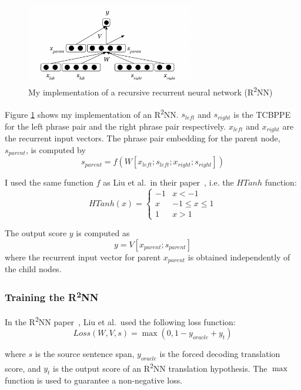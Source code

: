 \documentclass[12pt,a4paper,twoside]{report}
\begin{document}
\begin{figure}[ht]
\centering
\includegraphics[width=0.65\textwidth]{images/r2nn_imple.png}
\caption{My implementation of a recursive recurrent neural network (R\textsuperscript{2}NN)}
\label{fig:r2nn_imple}
\end{figure}

Figure \ref{fig:r2nn_imple} shows my implementation of an R\textsuperscript{2}NN. $s_{left}$ and $s_{right}$ is the TCBPPE for the left phrase pair and the right phrase pair respectively. $x_{left}$ and $x_{right}$ are the recurrent input vectors. The phrase pair embedding for the parent node, $s_{parent}$, is computed by
\[ s_{parent} = f(W[x_{left};s_{left};x_{right};s_{right}]) \]

I used the same function $f$ as Liu et al.~in their paper~\cite{r2nn}, i.e. the $HTanh$ function:
\[ HTanh(x) =
    \begin{cases}
      -1 & x < -1 \\
      x & -1\leq x\leq 1 \\
      1 & x > 1
   \end{cases}
\]

The output score $y$ is computed as
\[ y = V[x_{parent}; s_{parent}] \]
where the recurrent input vector for parent $x_{parent}$ is obtained independently of the child nodes.

\subsubsection{Training the \texorpdfstring{R\textsuperscript{2}NN}{R2NN}}

In the R\textsuperscript{2}NN paper~\cite{r2nn}, Liu et al.~used the following loss function:
\begin{equation}
\label{eq:loss}
Loss(W,V,s) = \max{(0, 1-y_{oracle} + y_t)}
\end{equation}

where $s$ is the source sentence span, $y_{oracle}$ is the forced decoding translation score, and $y_t$ is the output score of an R\textsuperscript{2}NN translation hypothesis. The $\max$ function is used to guarantee a non-negative loss.
\end{document}
